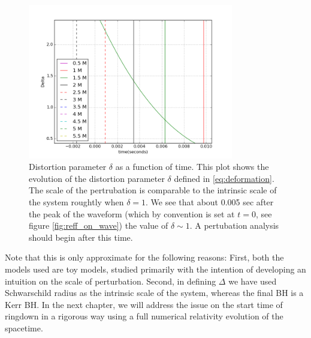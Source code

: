 \begin{figure}
\centering
\includegraphics[width=0.8\textwidth]{figures/Delta_of_t.png}
\caption{Distortion parameter $\delta$ as a function of time. This plot shows the evolution of the distortion parameter $\delta$ defined in \ref{eq:deformation}. The scale of the pertrubation is comparable to the intrinsic scale of the system roughtly when $\delta =1 $. We see that about 0.005 sec after the peak of the waveform (which by convention is set at $t=0$, see figure \ref{fig:reff_on_wave}) the value of $\delta \sim 1$. A pertubation analysis should begin after this time.}
\label{fig:delta}
\end{figure}

Note that this is only approximate for the following reasons: First, both the models used are toy models, studied primarily with the intention of developing an intuition on the scale of perturbation. Second, in defining $\Delta$ we have used Schwarschild radius as the intrinsic scale of the system, whereas the final BH is a Kerr BH. In the next chapter, we will address the issue on the start time of ringdown in a rigorous way using a full numerical relativity evolution of the spacetime. 

